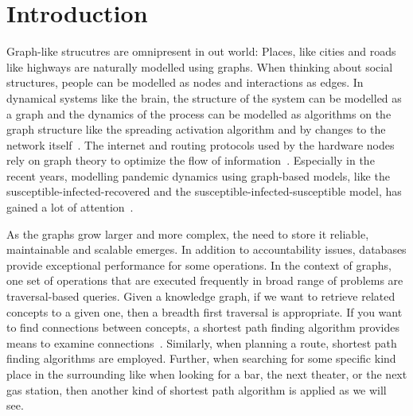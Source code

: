 \chapter{Introduction}\label{\positionnumber}
Graph-like strucutres are omnipresent in out world:
Places, like cities and roads like highways are naturally modelled using graphs.
When thinking about social structures, people can be modelled as nodes and interactions as edges. 
In dynamical systems like the brain, the structure of the system can be modelled as a graph and the dynamics of the process can be modelled as algorithms on the graph structure like the spreading activation algorithm and by changes to the network itself~\autocite{anderson, dayan1991reinforcing}.
The internet and routing protocols used by the hardware nodes rely on graph theory to optimize the flow of information~\autocite{bgp}.
Especially in the recent years, modelling pandemic dynamics using graph-based models, like the susceptible-infected-recovered and the susceptible-infected-susceptible model, has gained a lot of attention~\autocite{kermack1927contribution, dawood2012estimated, sridhar2020modelling, chang2020modelling}.

As the graphs grow larger and more complex, the need to store it reliable, maintainable and scalable emerges.
In addition to accountability issues, databases provide exceptional performance for some operations. 
In the context of graphs, one set of operations that are executed frequently in broad range of problems are traversal-based queries.
Given a knowledge graph, if we want to retrieve related concepts to a given one, then a breadth first traversal is appropriate. If you want to find connections between concepts, a shortest path finding algorithm provides means to examine connections~\autocite{minsky1982semantic}.
Similarly, when planning a route, shortest path finding algorithms are employed. Further, when searching for some specific kind place in the surrounding like when looking for a bar, the next theater, or the next gas station, then another kind of shortest path algorithm is applied as we will see.~\autocite{bast2016route} 

